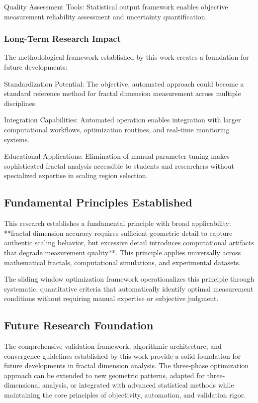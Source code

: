 \documentclass[preprint,12pt]{elsarticle}
\def\textbf#1{#1}%
\begin{document}
\textbf{Quality Assessment Tools}: Statistical output framework enables objective measurement reliability assessment and uncertainty quantification.

\subsubsection{Long-Term Research Impact}

The methodological framework established by this work creates a foundation for future developments:

\textbf{Standardization Potential}: The objective, automated approach could become a standard reference method for fractal dimension measurement across multiple disciplines.

\textbf{Integration Capabilities}: Automated operation enables integration with larger computational workflows, optimization routines, and real-time monitoring systems.

\textbf{Educational Applications}: Elimination of manual parameter tuning makes sophisticated fractal analysis accessible to students and researchers without specialized expertise in scaling region selection.

\subsection{Fundamental Principles Established}

This research establishes a fundamental principle with broad applicability: **fractal dimension accuracy requires sufficient geometric detail to capture authentic scaling behavior, but excessive detail introduces computational artifacts that degrade measurement quality**. This principle applies universally across mathematical fractals, computational simulations, and experimental datasets.

The sliding window optimization framework operationalizes this principle through systematic, quantitative criteria that automatically identify optimal measurement conditions without requiring manual expertise or subjective judgment.

\subsection{Future Research Foundation}

The comprehensive validation framework, algorithmic architecture, and convergence guidelines established by this work provide a solid foundation for future developments in fractal dimension analysis. The three-phase optimization approach can be extended to new geometric patterns, adapted for three-dimensional analysis, or integrated with advanced statistical methods while maintaining the core principles of objectivity, automation, and validation rigor.
\end{document}

